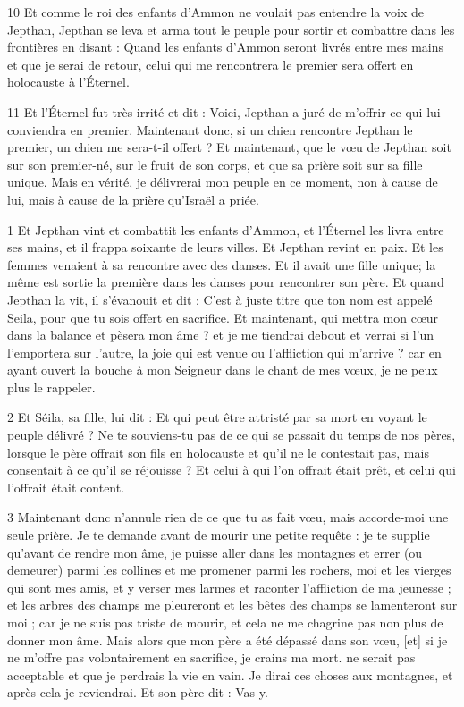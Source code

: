 \par 10 Et comme le roi des enfants d'Ammon ne voulait pas entendre la voix de Jepthan, Jepthan se leva et arma tout le peuple pour sortir et combattre dans les frontières en disant : Quand les enfants d'Ammon seront livrés entre mes mains et que je serai de retour, celui qui me rencontrera le premier sera offert en holocauste à l'Éternel.

\par 11 Et l'Éternel fut très irrité et dit : Voici, Jepthan a juré de m'offrir ce qui lui conviendra en premier. Maintenant donc, si un chien rencontre Jepthan le premier, un chien me sera-t-il offert ? Et maintenant, que le vœu de Jepthan soit sur son premier-né, sur le fruit de son corps, et que sa prière soit sur sa fille unique. Mais en vérité, je délivrerai mon peuple en ce moment, non à cause de lui, mais à cause de la prière qu'Israël a priée.


\par 1 Et Jepthan vint et combattit les enfants d'Ammon, et l'Éternel les livra entre ses mains, et il frappa soixante de leurs villes. Et Jepthan revint en paix. Et les femmes venaient à sa rencontre avec des danses. Et il avait une fille unique; la même est sortie la première dans les danses pour rencontrer son père. Et quand Jepthan la vit, il s'évanouit et dit : C'est à juste titre que ton nom est appelé Seila, pour que tu sois offert en sacrifice. Et maintenant, qui mettra mon cœur dans la balance et pèsera mon âme ? et je me tiendrai debout et verrai si l'un l'emportera sur l'autre, la joie qui est venue ou l'affliction qui m'arrive ? car en ayant ouvert la bouche à mon Seigneur dans le chant de mes vœux, je ne peux plus le rappeler.

\par 2 Et Séila, sa fille, lui dit : Et qui peut être attristé par sa mort en voyant le peuple délivré ? Ne te souviens-tu pas de ce qui se passait du temps de nos pères, lorsque le père offrait son fils en holocauste et qu'il ne le contestait pas, mais consentait à ce qu'il se réjouisse ? Et celui à qui l'on offrait était prêt, et celui qui l'offrait était content.

\par 3 Maintenant donc n'annule rien de ce que tu as fait vœu, mais accorde-moi une seule prière. Je te demande avant de mourir une petite requête : je te supplie qu'avant de rendre mon âme, je puisse aller dans les montagnes et errer (ou demeurer) parmi les collines et me promener parmi les rochers, moi et les vierges qui sont mes amis, et y verser mes larmes et raconter l'affliction de ma jeunesse ; et les arbres des champs me pleureront et les bêtes des champs se lamenteront sur moi ; car je ne suis pas triste de mourir, et cela ne me chagrine pas non plus de donner mon âme. Mais alors que mon père a été dépassé dans son vœu, [et] si je ne m'offre pas volontairement en sacrifice, je crains ma mort. ne serait pas acceptable et que je perdrais la vie en vain. Je dirai ces choses aux montagnes, et après cela je reviendrai. Et son père dit : Vas-y.

